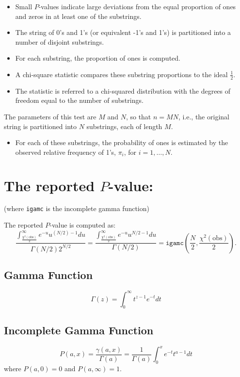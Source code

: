 \documentclass[12pt,openany]{book}
\theoremstyle{definition}
\begin{document}
	\begin{itemize}
		\item Small \( P \)-values indicate large deviations from the equal proportion of ones and zeros in at least one of the substrings.
		\item The string of 0's and 1's (or equivalent -1's and 1's) is partitioned into a number of disjoint substrings.
		\item For each substring, the proportion of ones is computed.
		\item A chi-square statistic compares these substring proportions to the ideal \( \frac{1}{2} \).
		\item The statistic is referred to a chi-squared distribution with the degrees of freedom equal to the number of substrings.
	\end{itemize}
	
	The parameters of this test are \( M \) and \( N \), so that \( n = MN \), i.e., the original string is partitioned into \( N \) substrings, each of length \( M \).
	
	\begin{itemize}
		\item For each of these substrings, the probability of ones is estimated by the observed relative frequency of 1's, \( \pi_i \), for \( i = 1, \ldots, N \).
	\end{itemize}

	\section*{The reported \( P \)-value:}
	(where \texttt{igamc} is the incomplete gamma function)
	
	The reported \( P \)-value is computed as:
	\[
	\frac{\int_{\frac{\chi^2(\text{obs})}{2}}^{\infty} e^{-u} u^{(N/2)-1} du}{\Gamma(N/2)2^{N/2}} = \frac{\int_{\frac{\chi^2(\text{obs})}{2}}^{\infty} e^{-u} u^{N/2-1} du}{\Gamma(N/2)}
	= \texttt{igamc}\left( \frac{N}{2}, \frac{\chi^2(\text{obs})}{2} \right).
	\]
	
	\subsection*{Gamma Function}
	\[
	\Gamma(z) = \int_{0}^{\infty} t^{z-1}e^{-t}dt
	\]
	
	\subsection*{Incomplete Gamma Function}
	\[
	P(a,x) = \frac{\gamma(a,x)}{\Gamma(a)} = \frac{1}{\Gamma(a)}\int_{0}^{x}e^{-t}t^{a-1}dt
	\]
	where \(P(a,0) = 0\) and \(P(a,\infty) = 1\).
	
\end{document}
